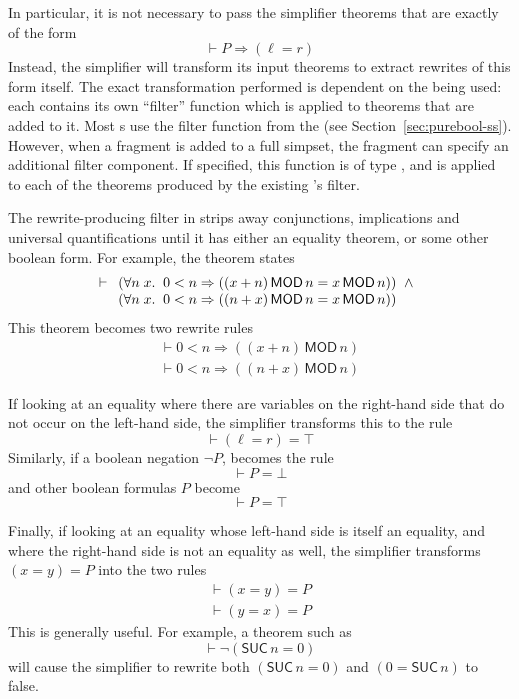 In particular, it is not necessary to pass the simplifier theorems
that are exactly of the form
\[
\vdash P \Rightarrow (\ell = r)
\]
Instead, the simplifier will transform its input theorems to extract
rewrites of this form itself.  The exact transformation performed is
dependent on the \simpset{} being used: each \simpset{} contains its
own ``filter'' function which is applied to theorems that are added to
it.  Most \simpset{}s use the filter function from the 
\simpset{} (see Section~\ref{sec:purebool-ss}).  However, when a
\simpset{} fragment is added to a full simpset, the fragment can
specify an additional filter component.  If specified, this function
is of type , and is applied to each of the
theorems produced by the existing \simpset's filter.

The rewrite-producing filter in  strips away
conjunctions, implications and universal quantifications until it has
either an equality theorem, or some other boolean form.  For example,
the theorem  states
\[
\vdash
\begin{array}[t]{l}
(\forall n\;x.\;\;0 < n \Rightarrow ((x + n)\,\textsf{MOD}\,n =
 x\,\textsf{MOD}\,n)) \;\;\land\\
(\forall n\;x.\;\;0 < n \Rightarrow ((n + x)\,\textsf{MOD}\,n =
 x\,\textsf{MOD}\,n))
\end{array}
\]
This theorem becomes two rewrite rules \[
\begin{array}{l}
\vdash 0 < n \Rightarrow ((x + n)\,\textsf{MOD}\,n)\\
\vdash 0 < n \Rightarrow ((n + x)\,\textsf{MOD}\,n)
\end{array}
\]

If looking at an equality where there are variables on the
right-hand side that do not occur on the left-hand side, the
simplifier transforms this to the rule \[
\vdash (\ell = r) = \top
\]
Similarly, if a boolean negation $\neg P$, becomes the rule \[
\vdash P = \bot
\]
and other boolean formulas $P$ become \[
\vdash P = \top
\]

Finally, if looking at an equality whose left-hand side is itself an
equality, and where the right-hand side is not an equality as well,
the simplifier transforms $(x = y) = P$ into the two rules
\[
\begin{array}{l}
\vdash (x = y) = P\\
\vdash (y = x) = P
\end{array}
\]
This is generally useful.  For example, a theorem such as
\[
\vdash \neg(\textsf{SUC}\,n = 0)
\]
will cause the simplifier to rewrite both $(\textsf{SUC}\,n = 0)$ and
$(0 = \textsf{SUC}\,n)$ to false.

